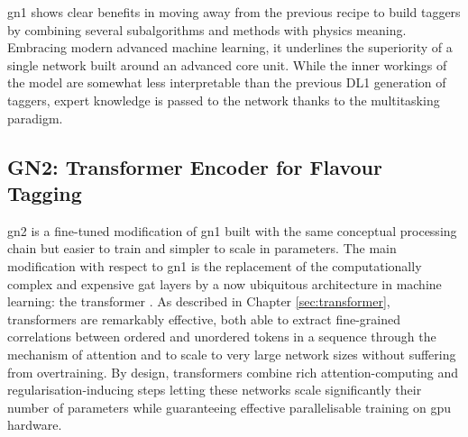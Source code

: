 \gls{gn1} shows clear benefits in moving away from the previous recipe to build taggers by combining several subalgorithms and methods with physics meaning. Embracing modern advanced machine learning, it underlines the superiority of a single network built around an advanced core unit. While the inner workings of the model are somewhat less interpretable than the previous DL1 generation of taggers, expert knowledge is passed to the network thanks to the multitasking paradigm. %

\subsection{GN2: Transformer Encoder for Flavour Tagging}\label{chap-GN2}
\gls{gn2} is a fine-tuned modification of \gls{gn1} built with the same conceptual processing chain but easier to train and simpler to scale in parameters. The main modification with respect to \gls{gn1} is the replacement of the computationally complex and expensive \gls{gat} layers by a now ubiquitous architecture in machine learning: the transformer \cite{NIPS_transformerPaper}. As described in Chapter \ref{sec:transformer}, transformers are remarkably effective, both able to extract fine-grained correlations between ordered and unordered tokens in a sequence through the mechanism of attention and to scale to very large network sizes without suffering from overtraining. By design, transformers combine rich attention-computing and regularisation-inducing steps letting these networks scale significantly their number of parameters while guaranteeing effective parallelisable training on \gls{gpu} hardware.  \\


